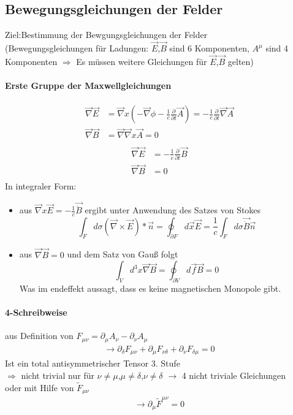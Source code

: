 \documentclass[a4paper]{article}
\begin{document}
\subsection{Bewegungsgleichungen der Felder}
Ziel:Bestimmung der Bewgungsgleichungen der Felder\\
(Bewegungsgleichungen für Ladungen: $\vec{E}$,$\vec{B}$ sind 6 Komponenten,
$A^\mu$ sind 4 Komponenten $\Rightarrow$ Es müssen weitere Gleichungen für
$\vec{E}$,$\vec{B}$ gelten)
\paragraph{Erste Gruppe der Maxwellgleichungen}
\begin{align}
\vec{\nabla} \vec{E}&=
\vec{\nabla}x(-\vec{\nabla}\phi-\frac{1}{c}\frac{\partial}{\partial
t}\vec{A})=-\frac{1}{c}\frac{\partial}{\partial t}\vec{\nabla}\vec{A}\\
\vec{\nabla}\vec{B}&= \vec{\nabla}\vec{\nabla}x\vec{A}=0\\  
\end{align}
\begin{align}
\vec{\nabla} \vec{E}&=-\frac{1}{c}\frac{\partial}{\partial t}\vec{B} \\
\vec{\nabla}\vec{B}&= 0\\
\end{align}
In integraler Form:
\begin{itemize}
  \item aus $\vec{\nabla}x\vec{E}=-\frac{1}{c}\vec{\ddot{B}}$ ergibt unter
  Anwendung des Satzes von Stokes \begin{equation}
  \int_F d\sigma (\vec{\nabla}\times\vec{E})*\vec{n}=\oint_{\partial
  F}d\vec{x}\vec{E}=\frac{1}{c}\int_F d\sigma \vec{\ddot{B}}\vec{n}
  \end{equation}
  \item aus $\vec{\nabla}\vec{B}=0$ und dem Satz von Gauß folgt \begin{equation}
  \int_V d^3x\vec{\nabla}\vec{B}=\oint_{\partial V}d\vec{f}\vec{B}=0
  \end{equation}
  Was im endeffekt aussagt, dass es keine magnetischen Monopole gibt.
\end{itemize}

\paragraph{4-Schreibweise}
aus Definition von $F_{\mu\nu}=\partial_\mu A_\nu-\partial_\nu A_\mu$
\begin{align}
\rightarrow \partial_\delta F_{\mu\nu} +\partial_\mu F_{\nu\delta}
+\partial_\nu F_{\delta\mu} =0
\end{align} 
Ist ein total antisymmetrischer Tensor 3. Stufe\\
$\Rightarrow$ nicht trivial nur für $\nu\neq\mu$,$\mu\neq\delta$,$\nu\neq\delta$
$\rightarrow$ 4 nicht triviale Gleichungen\\
oder mit Hilfe von $\tilde{F}_{\mu\nu}$\\
\begin{align}
\rightarrow \partial_\mu\tilde{F}^{\mu\nu}=0
\end{align}
\end{document}

